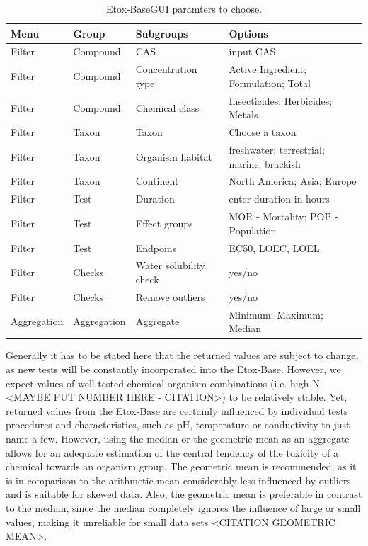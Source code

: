 \documentclass[english]{article}
\newcommand{\etoxbase}{Etox-Base}
\begin{document}
\begin{table}[h!]
\begin{tabular}{|l|l|l|l|}
\hline
Menu   & Group       & Subgroups              & Options \\ \hline
Filter      & Compound    & CAS                    & input CAS \\ \hline
Filter      & Compound    & Concentration type     & Active Ingredient; Formulation; Total \\ \hline
Filter      & Compound    & Chemical class         & Insecticides; Herbicides; Metals \\ \hline
Filter      & Taxon       & Taxon                  & Choose a taxon \\ \hline
Filter      & Taxon       & Organism habitat       & freshwater; terrestrial; marine; brackish \\ \hline
Filter      & Taxon       & Continent              & North America; Asia; Europe \\ \hline
Filter      & Test        & Duration               & enter duration in hours \\ \hline
Filter      & Test        & Effect groups          & MOR - Mortality; POP - Population \\ \hline
Filter      & Test        & Endpoins               & EC50, LOEC, LOEL \\ \hline
Filter      & Checks      & Water solubility check & yes/no \\ \hline
Filter      & Checks      & Remove outliers        & yes/no \\ \hline
Aggregation & Aggregation & Aggregate              & Minimum; Maximum; Median \\ \hline
\end{tabular}
\caption{\etoxbase GUI paramters to choose.}
\label{tab:inputs}
\end{table}



Generally it has to be stated here that the returned values are subject to change, as new tests will be constantly incorporated into the \etoxbase{}. However, we expect values of well tested chemical-organism combinations (i.e. high N <MAYBE PUT NUMBER HERE - CITATION>) to be relatively stable. Yet, returned values from the \etoxbase{} are certainly influenced by individual tests procedures and characteristics, such as pH, temperature or conductivity to just name a few. However, using the median or the geometric mean as an aggregate allows for an adequate estimation of the central tendency of the toxicity of a chemical towards an organism group. The geometric mean is recommended, as it is in comparison to the arithmetic mean considerably less influenced by outliers and is suitable for skewed data. Also, the geometric mean is preferable in contrast to the median, since the median completely ignores the influence of large or small values, making it unreliable for small data sets <CITATION GEOMETRIC MEAN>.
\end{document}
